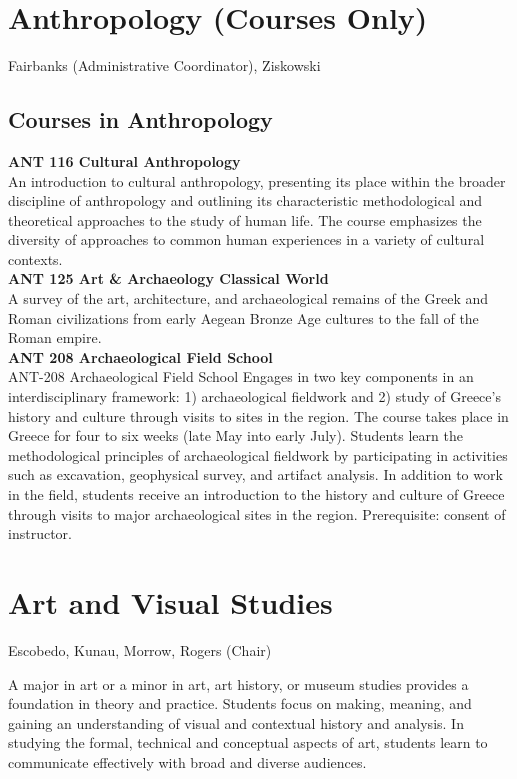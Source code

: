 \documentclass[
  letterpaper,
]{scrbook}
\begin{document}
\section{Anthropology (Courses Only)}\label{anthropology-courses-only}

Fairbanks (Administrative Coordinator), Ziskowski

\subsection{Courses in Anthropology}\label{courses-in-anthropology}

\textbf{ANT 116 Cultural Anthropology}\\
An introduction to cultural anthropology, presenting its place within
the broader discipline of anthropology and outlining its characteristic
methodological and theoretical approaches to the study of human life.
The course emphasizes the diversity of approaches to common human
experiences in a variety of cultural contexts.\\
\textbf{ANT 125 Art \& Archaeology Classical World}\\
A survey of the art, architecture, and archaeological remains of the
Greek and Roman civilizations from early Aegean Bronze Age cultures to
the fall of the Roman empire.\\
\textbf{ANT 208 Archaeological Field School}\\
ANT-208 Archaeological Field School Engages in two key components in an
interdisciplinary framework: 1) archaeological fieldwork and 2) study of
Greece's history and culture through visits to sites in the region. The
course takes place in Greece for four to six weeks (late May into early
July). Students learn the methodological principles of archaeological
fieldwork by participating in activities such as excavation, geophysical
survey, and artifact analysis. In addition to work in the field,
students receive an introduction to the history and culture of Greece
through visits to major archaeological sites in the region.
Prerequisite: consent of instructor.

\section{Art and Visual Studies}\label{art-and-visual-studies}

Escobedo, Kunau, Morrow, Rogers (Chair)

A major in art or a minor in art, art history, or museum studies
provides a foundation in theory and practice. Students focus on making,
meaning, and gaining an understanding of visual and contextual history
and analysis. In studying the formal, technical and conceptual aspects
of art, students learn to communicate effectively with broad and diverse
audiences.
\end{document}
